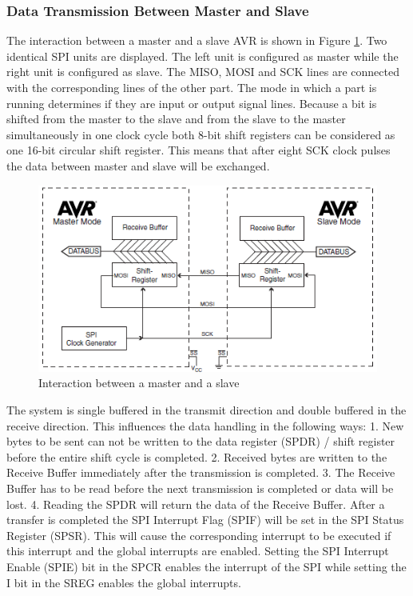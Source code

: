 \subsubsection{Data Transmission Between Master and Slave}
The interaction between a master and a slave AVR is shown in Figure \ref{Interaction}. Two identical
SPI units are displayed. The left unit is configured as master while the right unit is configured
as slave. The MISO, MOSI and SCK lines are connected with the corresponding lines of the
other part. The mode in which a part is running determines if they are input or output signal lines.
Because a bit is shifted from the master to the slave and from the slave to the master simultaneously
in one clock cycle both 8-bit shift registers can be considered as one 16-bit circular shift
register. This means that after eight SCK clock pulses the data between master and slave will be
exchanged.
\begin{figure}[htpb]
	\centering
	\includegraphics[scale=0.7]{Images/MasterandSlave.png}
	\caption{Interaction between a master and a slave}
	\label{Interaction}
\end{figure}
The system is single buffered in the transmit direction and double buffered in the receive direction.
This influences the data handling in the following ways:
1. New bytes to be sent can not be written to the data register (SPDR) / shift register before
the entire shift cycle is completed.
2. Received bytes are written to the Receive Buffer immediately after the transmission is
completed.
3. The Receive Buffer has to be read before the next transmission is completed or data will
be lost.
4. Reading the SPDR will return the data of the Receive Buffer.
After a transfer is completed the SPI Interrupt Flag (SPIF) will be set in the SPI Status Register
(SPSR). This will cause the corresponding interrupt to be executed if this interrupt and the global
interrupts are enabled. Setting the SPI Interrupt Enable (SPIE) bit in the SPCR enables the interrupt
of the SPI while setting the I bit in the SREG enables the global interrupts.

